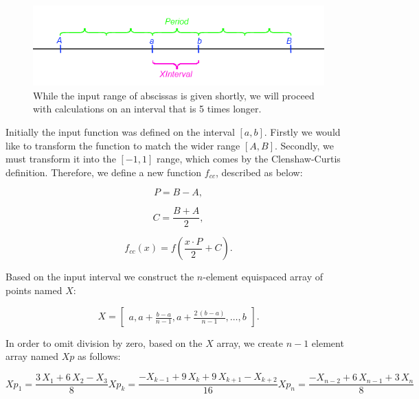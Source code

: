 \documentclass[12pt,twoside,a4paper]{article}
\numberwithin{equation}{subsection}
\numberwithin{figure}{subsection}
\begin{document}
\begin{figure} 
  \includegraphics[width=150mm]{img/cci_bigger_interval.png}
  \caption{While the input range of abscissas is given shortly, we will proceed with calculations on an interval that is 5 times longer. \label{fig:cci_bigger_interval}
  }
\end{figure}

Initially the input function was defined on the interval $[a, b]$. Firstly we would like to transform the function to match the wider range $[A, B]$. Secondly, we must transform it into the $[-1, 1]$ range, which comes by the Clenshaw-Curtis definition. Therefore, we define a new function $f_{cc}$, described as below:

\begin{equation} \label{eq:cci_period}
	P = B - A,
\end{equation}

\begin{equation} \label{eq:cci_center}
	C = \frac{B + A}{2},
\end{equation}

\begin{equation} \label{eq:cci_cecfun}
	f_{cc}(x) = f \left( \frac{x \cdot P}{2} + C\right).
\end{equation}



Based on the input interval we construct the $n$-element equispaced array of points named $X$:

\begin{equation}
	X = \begin{bmatrix}
			a, a + \frac{b-a}{n-1}, a + \frac{2 \, (b - a)}{n-1}, \ldots, b
		\end{bmatrix}.
\end{equation}

In order to omit division by zero, based on the $X$ array, we create $n-1$ element array named $Xp$ as follows:

\begin{subequations} \label{eq:cci_cubicinterpolation}
  \begin{equation}   \label{eq:ccicinterp_first}
    Xp_1 = \frac {3 \, X_1 + 6 \, X_2 - X_3}{8}
  \end{equation}
  \begin{equation}   \label{eq:ccicinterp_next}
    Xp_k = \frac { - X_{k - 1} + 9 \, X_k + 9 \, X_{k + 1} - X_{k + 2}}{16}
  \end{equation}
  \begin{equation}   \label{eq:ccicinterp_last}
    Xp_n = \frac { - X_{n - 2} + 6 \, X_{n - 1} + 3 \, X_n}{8}
  \end{equation}
\end{subequations}
\end{document}
